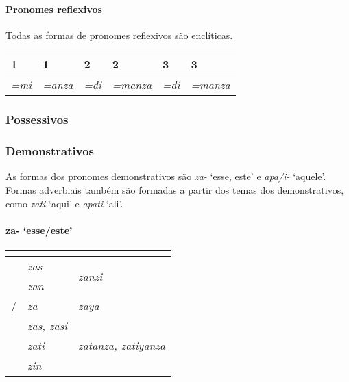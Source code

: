\paragraph{Pronomes reflexivos}
Todas as formas de pronomes reflexivos são enclíticas.

\begin{center}
	\begin{tabular}[c]{ll|ll|ll}
		\toprule
		1\Sg{}\emph{} & 1\Pl{}\emph{} & 2\Sg{}\emph{} & 2\Pl{}\emph{} & 3\Sg{}\emph{} & 3\Pl{}\emph{} \\
		\midrule
		\emph{=mi}    & \emph{=anza}  & \emph{=di}    & \emph{=manza} & \emph{=di}    & \emph{=manza} \\
		\bottomrule
	\end{tabular}
\end{center}

\subsubsection{Possessivos}

\subsubsection{Demonstrativos}
As formas dos pronomes demonstrativos são \emph{za-} `esse, este' e
\emph{apa\slash{}i-} `aquele'.
Formas adverbiais também são formadas a partir dos temas dos demonstrativos,
como \emph{zati} `aqui' e \emph{apati} `ali'.

\paragraph{za- `esse/este'}

\begin{center}
	\begin{tabular}[c]{lll}
		\toprule
		                 & \Sg{}\emph{}     & \Pl{}\emph{}                    \\
		\midrule
		\Nom{} \Com{}    & \emph{zas}       & \multirow{2}{4em}{\emph{zanzi}} \\
		\Acu{} \Com{}    & \emph{zan}       &                                 \\
		\Nom/\Acu\Neut{} & \emph{za}        & \emph{zaya}                     \\
		\Gen{}           & \emph{zas, zasi} &                                 \\
		\Dat{}           & \emph{zati}      & \emph{zatanza, zatiyanza}       \\
		\Abl{}           & \emph{zin}       & \emph{}                         \\
		\bottomrule
	\end{tabular}
\end{center}


